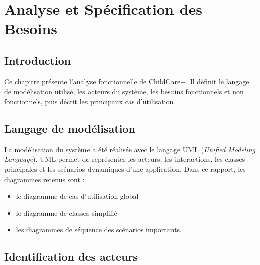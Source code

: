 \chapter{Analyse et Spécification des Besoins}
\label{chap:analyse}

\section*{Introduction}
Ce chapitre présente l'analyse fonctionnelle de ChildCare+. Il définit le langage de modélisation utilisé, les acteurs du système, les besoins fonctionnels et non fonctionnels, puis décrit les principaux cas d'utilisation.

\section{Langage de modélisation}
\label{sec:uml}

La modélisation du système a été réalisée avec le langage UML (\textit{Unified Modeling Language}). UML permet de représenter les acteurs, les interactions, les classes principales et les scénarios dynamiques d'une application. Dans ce rapport, les diagrammes retenus sont :

\begin{itemize}
    \item le diagramme de cas d'utilisation global 
    \item le diagramme de classes simplifié 
    \item les diagrammes de séquence des scénarios importants.
\end{itemize}

\section{Identification des acteurs}
\label{sec:acteurs}

